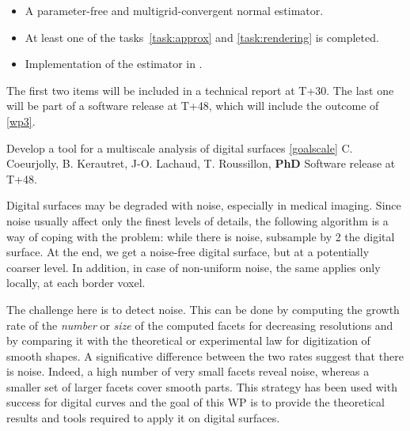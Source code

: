 \Success
\begin{itemize}
  \item A parameter-free and multigrid-convergent normal estimator.
  \item At least one of the tasks~\ref{task:approx} and \ref{task:rendering} is completed. 
  \item Implementation of the estimator in \DGtal.
\end{itemize}

The first two items will be included in a technical report at T+30.
The last one will be part of a software release at T+48, which will include
the outcome of \ref{wp3}. 

  

\medskip
{}
   {Develop a tool for a multiscale analysis of digital surfaces \ref{goalscale}}
   {C. Coeurjolly, B. Kerautret, J-O. Lachaud, T. Roussillon, \textbf{PhD}}
   {Software release at T+48.}
\medskip

Digital surfaces may be degraded with noise, especially in medical imaging.
Since noise usually affect only the finest levels of details, the following algorithm
is a way of coping with the problem: while there is noise, subsample by 2 the digital surface.
At the end, we get a noise-free digital surface, but at a potentially coarser level.
In addition, in case of non-uniform noise, the same applies only locally, \ie at each border voxel.  

The challenge here is to detect noise. This can be done by computing the growth rate of the
\emph{number} or \emph{size} of the computed facets for decreasing resolutions
and by comparing it with the theoretical or experimental law for digitization of smooth shapes.
A significative difference between the two rates suggest that there is noise.
Indeed, a high number of very small facets reveal noise, whereas
a smaller set of larger facets cover smooth parts.     
This strategy has been used with success for digital curves \cite{Kerautret2012}
and the goal of this WP is to provide the theoretical results and tools required to apply it on digital surfaces. 

